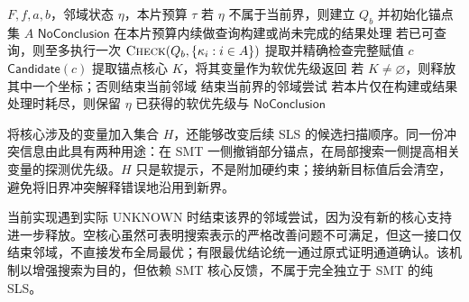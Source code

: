 \begin{algorithm}[htbp]
\caption{\textsc{CoreNeighborhood}：核心指导的邻域演化}
\label{alg:core}
\begin{algorithmic}[1]
\Require $F,f,a,b$，邻域状态 $\eta$，本片预算 $\tau$
\State 若 $\eta$ 不属于当前界，则建立 $Q_b$ 并初始化锚点集 $A$
 \State \Return $\mathsf{NoConclusion}$ \EndIf
\State 在本片预算内续做查询构建或尚未完成的结果处理
\State 若已可查询，则至多执行一次 $\Call{Check}{Q_b,\{\kappa_i:i\in A\}}$
 \State 提取并精确检查完整赋值 $c$
  \State \Return $\mathsf{Candidate}(c)$ \EndIf
{}
 \State 提取锚点核心 $K$，将其变量作为软优先级返回
 \State 若 $K\ne\varnothing$，则释放其中一个坐标；否则结束当前邻域
 \State 结束当前界的邻域尝试
\EndIf
\State 若本片仅在构建或结果处理时耗尽，则保留 $\eta$
\State \Return 已获得的软优先级与 $\mathsf{NoConclusion}$
\end{algorithmic}
\end{algorithm}

将核心涉及的变量加入集合 $H$，还能够改变后续 SLS 的候选扫描顺序。同一份冲突信息由此具有两种用途：在 SMT 一侧撤销部分锚点，在局部搜索一侧提高相关变量的探测优先级。$H$ 只是软提示，不是附加硬约束；接纳新目标值后会清空，避免将旧界冲突解释错误地沿用到新界。

当前实现遇到实际 UNKNOWN 时结束该界的邻域尝试，因为没有新的核心支持进一步释放。空核心虽然可表明搜索表示的严格改善问题不可满足，但这一接口仅结束邻域，不直接发布全局最优；有限最优结论统一通过原式证明通道确认。该机制以增强搜索为目的，但依赖 SMT 核心反馈，不属于完全独立于 SMT 的纯 SLS。

